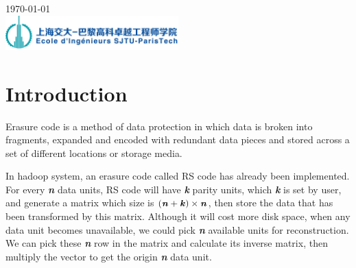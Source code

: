 \documentclass[10pt]{article}
\begin{document}
\begin{titlepage}


{\large \today}\\[2cm] %


\includegraphics[width=0.5\textwidth]{logo_SPEIT.jpg}\\[1cm] %


\vfill %

\end{titlepage}
\indent
\section{Introduction}
Erasure code is a method of data protection in which data is broken into fragments, expanded and encoded with redundant data pieces and stored across a set of different locations or storage media.

In hadoop system, an erasure code called RS code has already been implemented. For every \textbf{\textit{n}} data units, RS code will have \textbf{\textit{k}} parity units, which \textbf{\textit{k}} is set by user, and generate a matrix which size is $(\textbf{\textit{n}}+\textbf{\textit{k}})\times \textbf{\textit{n}}$, then store the data that has been transformed by this matrix. Although it will cost more disk space, when any data unit becomes unavailable, we could pick \textbf{\textit{n}} available units for reconstruction. We can pick these \textbf{\textit{n}} row in the matrix and calculate its inverse matrix, then multiply the vector to get the origin \textbf{\textit{n}} data unit.
\end{document}
